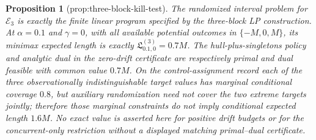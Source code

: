 \documentclass{article}
\newtheorem{proposition}{Proposition}
\begin{document}
\begin{proposition}[prop:three-block-kill-test]\label{prop:three-block-kill-test}
The randomized interval problem for \(\mathcal E_3\) is exactly the finite linear program specified by the three-block LP construction. At \(\alpha=0.1\) and \(\gamma=0\), with all available potential outcomes in \(\{-M,0,M\}\), its minimax expected length is exactly \(\mathfrak L^{(3)}_{0.1,0}=0.7M\). The hull-plus-singletons policy and analytic dual in the zero-drift certificate are respectively primal and dual feasible with common value \(0.7M\). On the control-assignment record each of the three observationally indistinguishable target values has marginal conditional coverage \(0.8\), but auxiliary randomization need not cover the two extreme targets jointly; therefore those marginal constraints do not imply conditional expected length \(1.6M\). No exact value is asserted here for positive drift budgets or for the concurrent-only restriction without a displayed matching primal--dual certificate.
\end{proposition}
\end{document}
